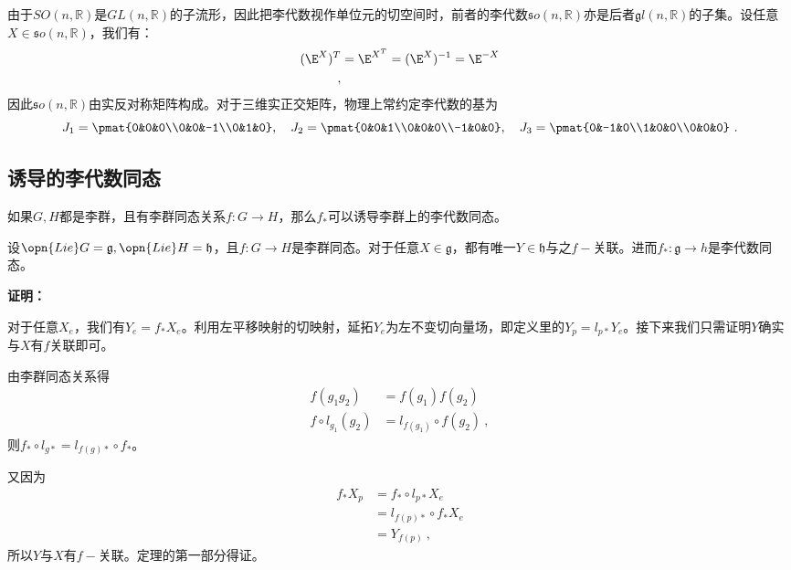 由于$SO(n,\mathbb R)$是$GL(n,\mathbb R)$的子流形，因此把李代数视作单位元的切空间时，前者的李代数$\mathfrak so(n,\mathbb R)$亦是后者$\mathfrak gl(n,\mathbb R)$的子集。设任意$X\in \mathfrak so(n,\mathbb R)$，我们有：
\begin{equation}
\begin{aligned}
(\E^{X})^T&=\E^{X^T}=(\E^{X})^{-1}=\E^{-X}\\
~,
\end{aligned}
\end{equation}
因此$\mathfrak so(n,\mathbb R)$由实反对称矩阵构成。对于三维实正交矩阵，物理上常约定李代数的基为
\begin{equation}J_1=\pmat{0&0&0\\0&0&-1\\0&1&0},\quad J_2=\pmat{0&0&1\\0&0&0\\-1&0&0},\quad J_3=\pmat{0&-1&0\\1&0&0\\0&0&0}~.\end{equation}


\subsection{诱导的李代数同态}
如果$G,H$都是李群，且有李群同态关系$f:G\to H$，那么$f_*$可以诱导李群上的李代数同态。
\begin{theorem}{}
设$\opn{Lie}G=\mathfrak g,\opn{Lie}H=\mathfrak h$，且$f:G\to H$是李群同态。对于任意$X\in \mathfrak g$，都有唯一$Y\in \mathfrak h$与之$f-$关联。进而$f_*:\mathfrak g\to h$是李代数同态。
\end{theorem}
\textbf{证明：}

对于任意$X_e$，我们有$Y_e=f_*X_e$。利用左平移映射的切映射，延拓$Y_e$为左不变切向量场，即定义里的$Y_p=l_{p*}Y_e$。接下来我们只需证明$Y$确实与$X$有$f$关联即可。

由李群同态关系得
\begin{equation}
\begin{aligned}
f(g_1g_2)&=f(g_1)f(g_2)\\
f\circ l_{g_1}(g_2)&=l_{f(g_1)}\circ f(g_2)~,
\end{aligned}
\end{equation}
则$f_*\circ l_{g*}=l_{f(g)*}\circ f_*$。

又因为
\begin{equation}
\begin{aligned}
f_*X_p&=f_*\circ l_{p*}X_e\\
&=l_{f(p)*}\circ f_*X_e\\
&=Y_{f(p)}~,
\end{aligned}
\end{equation}
所以$Y$与$X$有$f-$关联。定理的第一部分得证。

